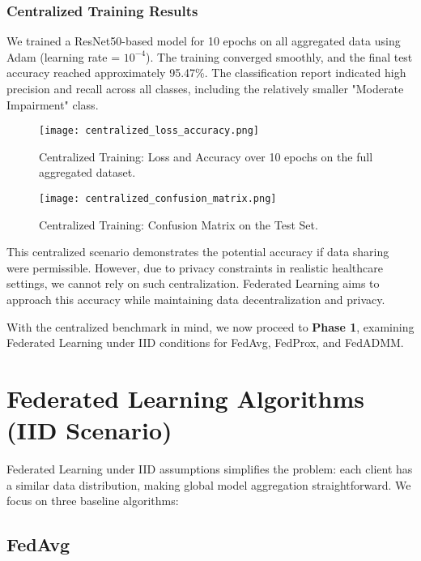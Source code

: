 \documentclass[12pt,a4paper]{report}
\begin{document}
\subsection{Centralized Training Results}

We trained a ResNet50-based model for 10 epochs on all aggregated data using Adam (learning rate = $10^{-4}$). The training converged smoothly, and the final test accuracy reached approximately 95.47\%. The classification report indicated high precision and recall across all classes, including the relatively smaller "Moderate Impairment" class.

\begin{figure}[H]
	\centering
	\texttt{[image: centralized\_loss\_accuracy.png]}
	\caption{Centralized Training: Loss and Accuracy over 10 epochs on the full aggregated dataset.}
	\label{fig:centralized_loss_acc}
\end{figure}

\begin{figure}[H]
	\centering
	\texttt{[image: centralized\_confusion\_matrix.png]}
	\caption{Centralized Training: Confusion Matrix on the Test Set.}
	\label{fig:centralized_confusion}
\end{figure}

This centralized scenario demonstrates the potential accuracy if data sharing were permissible. However, due to privacy constraints in realistic healthcare settings, we cannot rely on such centralization. Federated Learning aims to approach this accuracy while maintaining data decentralization and privacy.

\bigskip

With the centralized benchmark in mind, we now proceed to \textbf{Phase 1}, examining Federated Learning under IID conditions for FedAvg, FedProx, and FedADMM.

\chapter{Federated Learning Algorithms (IID Scenario)}

Federated Learning under IID assumptions simplifies the problem: each client has a similar data distribution, making global model aggregation straightforward. We focus on three baseline algorithms:

\section{FedAvg}
\end{document}
